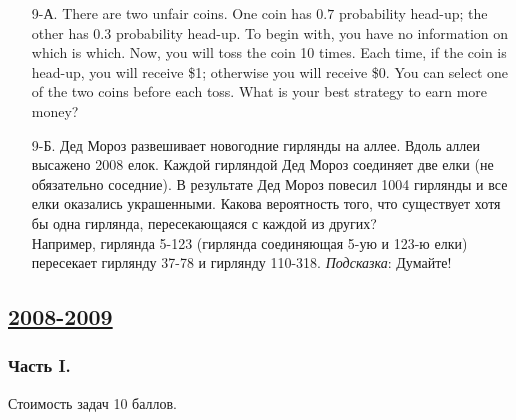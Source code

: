 \begin{enumerate}
\item[9-А.] There are two unfair coins. One coin has $0.7$ probability head-up;
the other has $0.3$ probability head-up. To begin with, you have no information
on which is which. Now, you will toss the coin 10 times. Each time, if the coin is
head-up, you will receive \$1; otherwise you will receive \$0. You can select one
of the two coins before each toss. What is your best strategy to earn more money?
\item[9-Б.] Дед Мороз развешивает новогодние гирлянды на аллее. Вдоль аллеи высажено
2008 елок. Каждой гирляндой Дед Мороз соединяет две елки (не обязательно соседние).
В результате Дед Мороз повесил 1004 гирлянды и все елки оказались украшенными.
Какова вероятность того, что существует хотя бы одна гирлянда, пересекающаяся с
каждой из других? \\
Например, гирлянда 5-123 (гирлянда соединяющая 5-ую и 123-ю елки) пересекает гирлянду
37-78 и гирлянду 110-318.
\emph{Подсказка}: Думайте!
\end{enumerate}



\newpage
\subsection[2008-2009]{\hyperref[sec:sol_kr_02_2008_2009]{2008-2009}}
\label{sec:kr_02_2008_2009}

\subsubsection*{Часть I.}

Стоимость задач 10 баллов.

